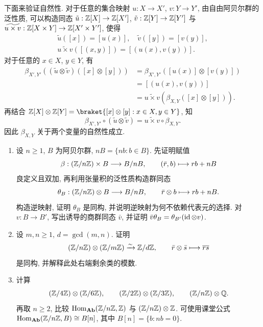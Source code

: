 \documentclass{article}
\begin{document}
\begin{solution}
	下面来验证自然性. 对于任意的集合映射 $u: X \to X'$, $v: Y \to Y'$, 由自由阿贝尔群的泛性质, 可以构造同态 $\tilde{u}: \mathbb{Z}[X] \to \mathbb{Z}[X']$, $\tilde{v}: \mathbb{Z}[Y] \to \mathbb{Z}[Y']$ 与 $\widetilde{u \times v}: \mathbb{Z}[X \times Y] \to \mathbb{Z}[X' \times Y']$, 使得
	\begin{gather*}
		\tilde{u}([x]) = [u(x)], \quad \tilde{v}([y]) = [v(y)], \\
		\widetilde{u \times v}([(x, y)]) = [(u(x), v(y))].
	\end{gather*}
	对于任意的 $x \in X$, $y \in Y$, 有
	\begin{align*}
		\beta_{X', Y'}((\tilde{u} \otimes \tilde{v})([x] \otimes [y]))
		&= \beta_{X', Y'}([u(x)] \otimes [v(y)]) \\
		&= [(u(x), v(y))] \\
		&= \widetilde{u \times v}(\beta_{X, Y}([x] \otimes [y])).
	\end{align*}
	再结合 $\Z[X] \otimes \Z[Y] = \braket{[x] \otimes [y]: x \in X, y \in Y}$, 知
	\[ \beta_{X', Y'} \circ (\tilde{u} \otimes \tilde{v}) = \widetilde{u \times v} \circ \beta_{X, Y}. \]
	因此 $\beta_{X, Y}$ 关于两个变量的自然性成立.
\end{solution}



\begin{problem}
\begin{enumerate}
  \item[(a)] 设 $n\ge1$, $B$ 为阿贝尔群, $nB=\{nb:b\in B\}$. 先证明赋值
  \[
    \beta:(\mathbb{Z}/n\mathbb{Z})\times B\longrightarrow B/nB,\qquad
    (\bar r,b)\longmapsto rb+nB
  \]
  良定义且双加, 再利用张量积的泛性质构造群同态
  \[
    \theta_B:(\mathbb{Z}/n\mathbb{Z})\otimes B\longrightarrow B/nB,\qquad
    \bar r\otimes b\longmapsto rb+nB.
  \]
  构造逆映射, 证明 $\theta_B$ 是同构, 并说明逆映射为何不依赖代表元的选择. 对 $v:B\to B'$, 写出诱导的商群同态 $\bar v$, 并证明 $\bar v\theta_B=\theta_{B'}(\operatorname{id}\otimes v)$.
  \item[(b)] 设 $m,n\ge1$, $d=\gcd(m,n)$. 证明
  \[
    (\mathbb{Z}/n\mathbb{Z})\otimes(\mathbb{Z}/m\mathbb{Z})\xrightarrow{\sim}\mathbb{Z}/d\mathbb{Z},\qquad
    \bar r\otimes\bar s\longmapsto\overline{rs}
  \]
  是同构, 并解释此处右端剩余类的模数.
  \item[(c)] 计算
  \[
    (\mathbb{Z}/4\mathbb{Z})\otimes(\mathbb{Z}/6\mathbb{Z}),\qquad
    (\mathbb{Z}/2\mathbb{Z})\otimes(\mathbb{Z}/3\mathbb{Z}),\qquad
    (\mathbb{Z}/n\mathbb{Z})\otimes\mathbb{Q}.
  \]
  再取 $n\ge2$, 比较 $\operatorname{Hom}_{\mathbf{Ab}}(\mathbb{Z}/n\mathbb{Z},\mathbb{Z})$ 与 $(\mathbb{Z}/n\mathbb{Z})\otimes\mathbb{Z}$. 可使用课堂公式 $\operatorname{Hom}_{\mathbf{Ab}}(\mathbb{Z}/n\mathbb{Z},B)\cong B[n]$, 其中 $B[n]=\{b:nb=0\}$.
\end{enumerate}
\end{problem}
\end{document}
